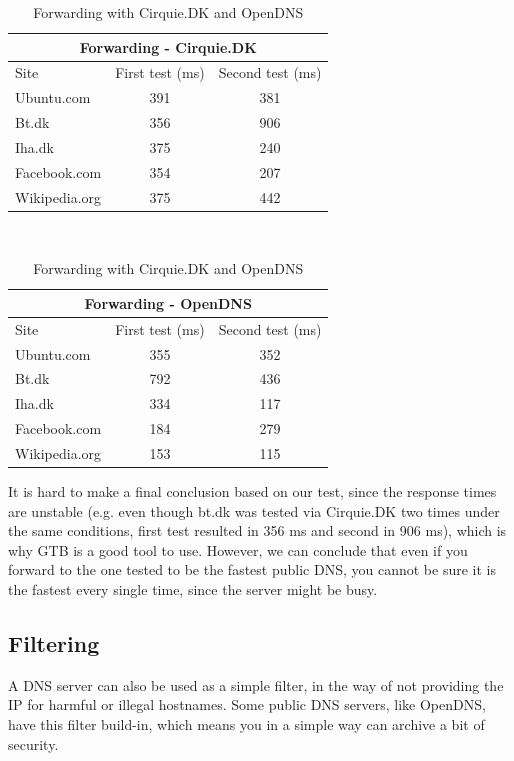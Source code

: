 \documentclass[Preamble]{subfiles}
\begin{document}
\begin{table}

\begin{center}
  \begin{tabular}{l|c|c}
    \multicolumn{3}{c}{Forwarding - Cirquie.DK}  \\
	\hline Site & First test (ms) & Second test (ms) \\ \hline
    Ubuntu.com & 391 & 381  \\ %
    Bt.dk & 356 & 906  \\ %
	Iha.dk & 375 & 240 \\ %
	Facebook.com & 354 &	207 \\ %
	Wikipedia.org & 375 & 442 \\ \hline
  \end{tabular}
\end{center}
~\\
\begin{center}
  \begin{tabular}{l|c|c}
    \multicolumn{3}{c}{Forwarding - OpenDNS}  \\
	\hline Site & First test (ms) & Second test (ms) \\     
    \hline
    Ubuntu.com & 355 & 352  \\ %
    Bt.dk & 792 & 436  \\ %
	Iha.dk & 334 & 117 \\ %
	Facebook.com & 184 & 279 \\ %
	Wikipedia.org & 153 & 115 \\ \hline
  \end{tabular}
\end{center}
\caption{Forwarding with Cirquie.DK and OpenDNS}
\label{tab:Forwarding}
\end{table}


It is hard to make a final conclusion based on our test, since the response times are unstable (e.g. even though bt.dk was tested via Cirquie.DK two times under the same conditions, first test resulted in 356 ms and second in 906 ms), which is why GTB is a good tool to use. 
However, we can conclude that even if you forward to the one tested to be the fastest public DNS, you cannot be sure it is the fastest every single time, since the server might be busy.

\subsection{Filtering}
A DNS server can also be used as a simple filter, in the way of not providing the IP for harmful or illegal hostnames. 
Some public DNS servers, like OpenDNS, have this filter build-in, which means you in a simple way can archive a bit of security.
\end{document}
